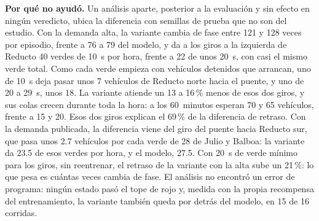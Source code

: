 \noindent\textbf{Por qué no ayudó.} Un análisis aparte, posterior a la
evaluación y sin efecto en ningún veredicto, ubica la diferencia con
semillas de prueba que no son del estudio. Con
la demanda alta, la variante cambia de fase entre 121 y 128 veces por
episodio, frente a 76 a 79 del modelo, y da a los giros a la izquierda
de Reducto 40 verdes de 10~s por hora, frente a 22 de unos 20~s, con
casi el mismo verde total. Como cada verde empieza con vehículos
detenidos que arrancan, uno de 10~s deja pasar unos 7 vehículos de
Reducto norte hacia el puente, y uno de 20 a 29~s, unos 18. La variante
atiende un 13 a 16\,\% menos de esos dos giros, y sus colas crecen
durante toda la hora: a los 60~minutos esperan 70 y 65 vehículos,
frente a 15 y 20. Esos dos giros explican el 69\,\% de la diferencia de
retraso. Con la demanda publicada, la diferencia viene del giro del
puente hacia Reducto sur,
que pasa unos 2.7 vehículos por cada verde de 28 de Julio y Balboa: la
variante da 23.5 de esos verdes por hora, y el modelo, 27.5. Con 20~s de
verde mínimo para los giros, sin reentrenar, el retraso de la variante
con la alta sube un 21\,\%: lo que pesa es cuántas veces cambia de fase.
El análisis no encontró un error de programa: ningún estado pasó el
tope de rojo y, medida con la propia recompensa del entrenamiento, la
variante también queda por detrás del modelo, en 15 de 16 corridas.

